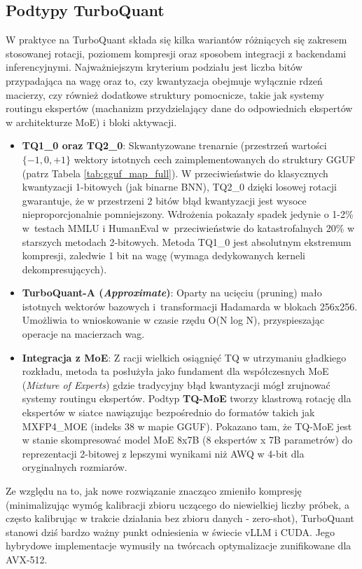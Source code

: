 \subsection{Podtypy TurboQuant}
W praktyce na TurboQuant składa się kilka wariantów różniących się zakresem stosowanej rotacji, poziomem kompresji oraz sposobem integracji z backendami inferencyjnymi. Najważniejszym kryterium podziału jest liczba bitów przypadająca na wagę oraz to, czy kwantyzacja obejmuje wyłącznie rdzeń macierzy, czy również dodatkowe struktury pomocnicze, takie jak systemy routingu ekspertów (machanizm przydzielający dane do odpowiednich ekspertów w architekturze MoE) i bloki aktywacji. \\

\begin{itemize}
    \item \textbf{TQ1\_0 oraz TQ2\_0}: Skwantyzowane trenarnie (przestrzeń wartości $\{-1, 0, +1\}$ wektory istotnych cech zaimplementowanych do struktury GGUF (patrz Tabela \ref{tab:gguf_map_full}). W przeciwieństwie do klasycznych kwantyzacji 1-bitowych (jak binarne BNN), TQ2\_0 dzięki losowej rotacji gwarantuje, że w przestrzeni 2 bitów błąd kwantyzacji jest wysoce nieproporcjonalnie pomniejszony. Wdrożenia pokazały spadek jedynie o 1-2\% w~testach MMLU i HumanEval w~przeciwieństwie do katastrofalnych 20\% w starszych metodach 2-bitowych. Metoda TQ1\_0 jest absolutnym ekstremum kompresji, zaledwie 1 bit na wagę (wymaga dedykowanych kerneli dekompresujących).
    
    \item \textbf{TurboQuant-A (\textit{Approximate})}: Oparty na ucięciu (pruning) mało istotnych wektorów bazowych i~transformacji Hadamarda w blokach 256x256. Umożliwia to wnioskowanie w czasie rzędu O(N log N), przyspieszając operacje na macierzach wag.
    
    \item \textbf{Integracja z MoE}: Z racji wielkich osiągnięć TQ w utrzymaniu gładkiego rozkładu, metoda ta posłużyła jako fundament dla współczesnych MoE (\textit{Mixture of Experts}) gdzie tradycyjny błąd kwantyzacji mógł zrujnować systemy routingu ekspertów. Podtyp \textbf{TQ-MoE} tworzy klastrową rotację dla ekspertów w siatce nawiązując bezpośrednio do formatów takich jak MXFP4\_MOE (indeks 38 w mapie GGUF). Pokazano tam, że TQ-MoE jest w stanie skompresować model MoE 8x7B (8 ekspertów x 7B parametrów) do reprezentacji 2-bitowej z lepszymi wynikami niż AWQ w 4-bit dla oryginalnych rozmiarów.
\end{itemize}

Ze względu na to, jak nowe rozwiązanie znacząco zmieniło kompresję (minimalizując wymóg kalibracji zbioru uczącego do niewielkiej liczby próbek, a często kalibrując w trakcie działania bez zbioru danych - zero-shot), TurboQuant stanowi dziś bardzo ważny punkt odniesienia w świecie vLLM i CUDA. Jego hybrydowe implementacje wymusiły na twórcach optymalizacje zunifikowane dla AVX-512.